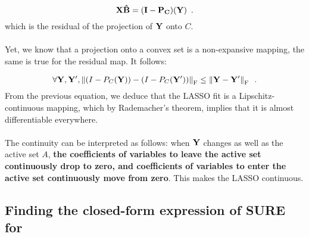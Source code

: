 \documentclass[a4paper,10pt]{article}
\theoremstyle{definition}
\begin{document}
\begin{equation*}
    \bf{X} \hat{\bf{B}} = (I - P_C)(\mathbf{Y})
    \enspace .
\end{equation*}
%
which is the residual of the projection of $\mathbf{Y}$ onto $C$.
\\
\\
Yet, we know that a projection onto a convex set is a non-expansive mapping, the same is true for the residual map. It follows:

\begin{equation*}
    \forall \mathbf{Y}, \mathbf{Y'}, \left \lVert (I - P_C(\mathbf{Y})) - (I - P_C(\mathbf{Y'})) \right \rVert_{\text{F}} \leq \left \lVert \bf{Y - Y'} \right \rVert_{\text{F}}
    \enspace .
\end{equation*}
%
From the previous equation, we deduce that the LASSO fit is a Lipschitz-continuous mapping, which by Rademacher's theorem, implies that it is almost differentiable everywhere.
\\
\\
The continuity can be interpreted as follows: when $\mathbf{Y}$ changes as well as the active set $A$, \textbf{the coefficients of variables to leave
the active set continuously drop to zero, and coefficients of variables to enter the active set continuously move from zero}. This makes the LASSO continuous.

\subsection*{Finding the closed-form expression of SURE for }
\end{document}

